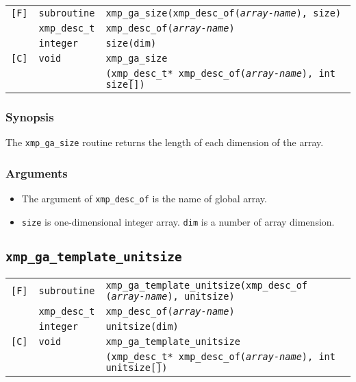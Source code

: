 \begin{description}
\begin{tabular}{lll}

\verb![F]!&  {\tt subroutine}& {\tt xmp\_ga\_size(xmp\_desc\_of({\it array-name}), size)}\\
          & {\tt xmp\_desc\_t} & {\tt xmp\_desc\_of({\it array-name})}\\
          & {\tt integer} & {\tt size(dim)}\\

\verb![C]!&  {\tt void}& {\tt xmp\_ga\_size}\\
          & & {\tt (xmp\_desc\_t* xmp\_desc\_of({\it array-name}), int size[])}\\

\end{tabular}

\subsubsection*{Synopsis}

The {\tt xmp\_ga\_size} routine returns the length of each dimension of the array.

\subsubsection*{Arguments}

\begin{itemize}
 \item The argument of {\tt xmp\_desc\_of} is the name of global array.
 \item {\tt size} is one-dimensional integer array. {\tt dim} is a number of array dimension.
\end{itemize}


\subsection{\tt xmp\_ga\_template\_unitsize}

\begin{tabular}{lll}

\verb![F]!&  {\tt subroutine}& {\tt xmp\_ga\_template\_unitsize(xmp\_desc\_of
({\it array-name}), unitsize)}\\
          & {\tt xmp\_desc\_t} & {\tt xmp\_desc\_of({\it array-name})}\\
          & {\tt integer} & {\tt unitsize(dim)}\\

\verb![C]!&  {\tt void}& {\tt xmp\_ga\_template\_unitsize}\\
          & & {\tt (xmp\_desc\_t* xmp\_desc\_of({\it array-name}), int unitsize[])}\\


\end{tabular}
\end{description}
